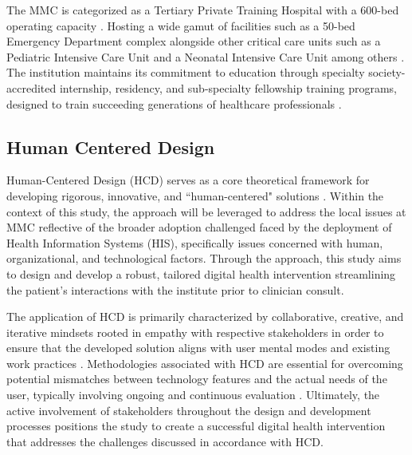 \documentclass[11pt,a4paper,titlepage]{article}
\begin{document}
	The MMC is categorized as a Tertiary Private Training Hospital with a 600-bed operating capacity \cite{MMC_Proceedings_Mar2025_Vol20, MMC_Proceedings_Sep2023}. Hosting a wide gamut of facilities such as a 50-bed Emergency Department complex alongside other critical care units such as a Pediatric Intensive Care Unit and a Neonatal Intensive Care Unit among others \cite{MMC_Compendium_2022_2023}. The institution maintains its commitment to education through specialty society-accredited internship, residency, and sub-specialty fellowship training programs, designed to train succeeding generations of healthcare professionals \cite{MMC_Compendium_2022_2023}. 
	
	\subsection{Human Centered Design}
	Human-Centered Design (HCD) serves as a core theoretical framework for developing rigorous, innovative, and ``human-centered" solutions \cite{leary_2022_an, gttgens_2021_the}. Within the context of this study, the approach will be leveraged to address the local issues at MMC reflective of the broader adoption challenged faced by the deployment of Health Information Systems (HIS), specifically issues concerned with human, organizational, and technological factors. Through the approach, this study aims to design and develop a robust, tailored digital health intervention streamlining the patient's interactions with the institute prior to clinician consult. 
	
	The application of HCD is primarily characterized by collaborative, creative, and iterative mindsets rooted in empathy with respective stakeholders in order to ensure that the developed solution aligns with user mental modes and existing work practices \cite{leary_2022_an, gttgens_2021_the, wentzel_keeping_an_eye}. Methodologies associated with HCD are essential for overcoming potential mismatches between technology features and the actual needs of the user, typically involving ongoing and continuous evaluation \cite{wentzel_keeping_an_eye}. Ultimately, the active involvement of stakeholders throughout the design and development processes positions the study to create a successful digital health intervention that addresses the challenges discussed in accordance with HCD.
	
\end{document}
